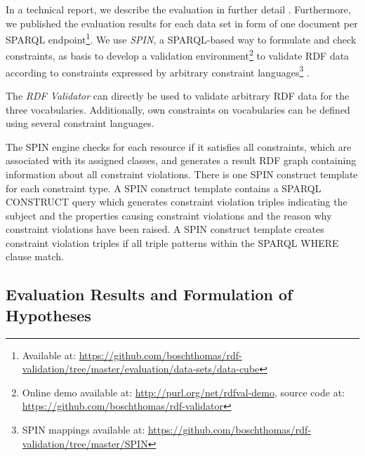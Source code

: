 \documentclass[conference]{IEEEtran}
\newcommand{\tb}[1]{\todo[size=\small, color=green!40]{\textbf{Thomas:} #1}}
\begin{document}
In a technical report, we describe the evaluation in further detail \cite{BoschZapilkoWackerowEckert2015-2}. Furthermore, we published the evaluation results for each data set in form of one document per SPARQL endpoint\footnote{Available at: \url{https://github.com/boschthomas/rdf-validation/tree/master/evaluation/data-sets/data-cube}}.
\tb{why SPIN?}
We use \emph{SPIN}, a SPARQL-based way to formulate and check constraints, as basis to develop a
validation environment\footnote{Online demo available at: \url{http://purl.org/net/rdfval-demo}, source code at: \url{https://github.com/boschthomas/rdf-validator}} to validate RDF data according to constraints expressed by arbitrary constraint languages\footnote{SPIN mappings available at: \url{https://github.com/boschthomas/rdf-validation/tree/master/SPIN}} \cite{BoschEckert2014-2}.

The \emph{RDF Validator} can directly be used to validate arbitrary RDF data for the three vocabularies. Additionally, own constraints on vocabularies can be defined using several constraint languages.

The SPIN engine checks for each resource if it satisfies all constraints, which are associated with its assigned classes, and generates a result RDF graph containing information about all constraint violations.
There is one SPIN construct template for each constraint type.
A SPIN construct template contains a SPARQL CONSTRUCT query which generates constraint violation triples indicating the subject and the properties causing constraint violations and the reason why constraint violations have been raised.
A SPIN construct template creates constraint violation triples if all triple patterns within the SPARQL WHERE clause match.

\subsection{Evaluation Results and Formulation of Hypotheses}

\end{document}
